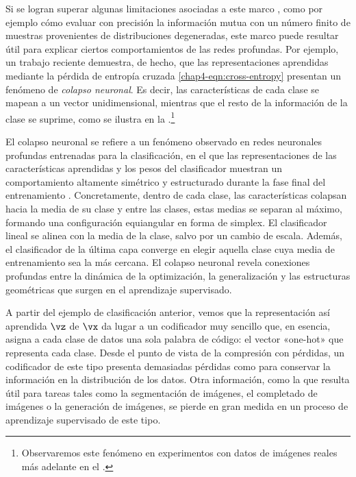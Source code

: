\documentclass[../../book-main.tex]{subfiles}
\begin{document}
Si se logran superar algunas limitaciones asociadas a este marco
\cite{kolchinsky2018caveats-ICLR2018}, como por ejemplo cómo evaluar con precisión
la información mutua con un número finito de muestras provenientes de distribuciones degeneradas,
este marco puede resultar útil para explicar ciertos
comportamientos de las redes profundas.
Por ejemplo, un trabajo reciente \cite{papyan2020prevalence} demuestra, de hecho,
que las representaciones aprendidas mediante la pérdida de entropía cruzada
\eqref{chap4-eqn:cross-entropy} presentan un fenómeno de \emph{colapso neuronal}.
Es decir, las características de cada clase se mapean a un vector unidimensional,
mientras que el resto de la información de la clase se suprime, como
se ilustra en la .\footnote{Observaremos 
    este fenómeno en experimentos con datos de imágenes reales más adelante
en el .}
\begin{remark}
    El colapso neuronal se refiere a un fenómeno observado en redes neuronales profundas
    entrenadas para la clasificación, en el que las representaciones de las características
    aprendidas y los pesos del clasificador muestran un comportamiento altamente simétrico y
    estructurado durante la fase final del entrenamiento
    \cite{papyan2020prevalence,zhu2021geometric,yaras2022neural}.
    Concretamente, dentro de 
    cada clase, las características colapsan hacia la media de su clase y entre
    las clases, estas medias se separan al máximo, formando una configuración
    equiangular en forma de simplex. El clasificador lineal se alinea con la
    media de la clase, salvo por un cambio de escala. Además, el clasificador de la última capa
    converge en elegir aquella clase cuya media de entrenamiento
    sea la más cercana. El colapso neuronal revela conexiones profundas entre la dinámica de la optimización,
    la generalización y las estructuras geométricas que surgen en
    el aprendizaje supervisado.
    \label{remark:neural-collapse}
\end{remark}

A partir del ejemplo de clasificación anterior, vemos que la representación así
aprendida $\vz$ de $\vx$ da lugar a un codificador muy sencillo que,
en esencia, asigna a cada clase de datos una sola palabra de código: el
vector «one-hot» que representa cada clase. Desde el punto de vista de la compresión con pérdidas,
un codificador de este tipo presenta demasiadas pérdidas como para conservar la información en
la distribución de los datos. Otra información, como la que resulta útil para
tareas tales como la segmentación de imágenes, el completado de imágenes o la generación de imágenes, se
pierde en gran medida en un proceso de aprendizaje supervisado de este tipo.
\end{document}

